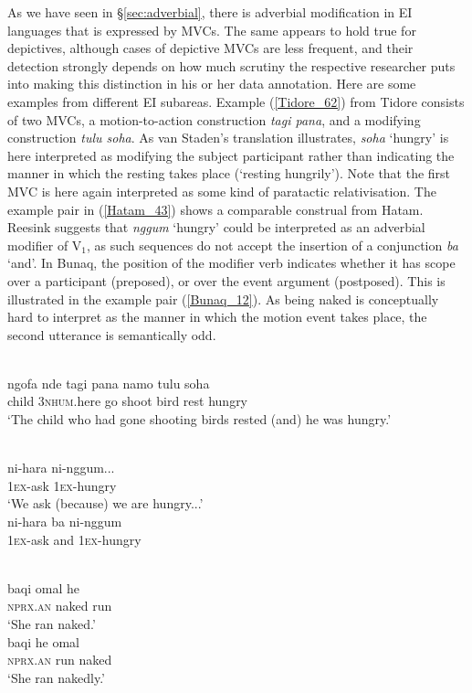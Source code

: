 As we have seen in §\ref{sec:adverbial}, there is adverbial modification in EI languages that is expressed by MVCs. The same appears to hold true for depictives, although cases of depictive MVCs are less frequent, and their detection strongly depends on how much scrutiny the respective researcher puts into making this distinction in his or her data annotation. Here are some examples from different EI subareas. Example (\ref{Tidore_62}) from Tidore consists of two MVCs, a motion-to-action construction \textit{tagi pana}, and a modifying construction \textit{tulu soha}. As van Staden's translation illustrates, \textit{soha} `hungry' is here interpreted as modifying the subject participant rather than indicating the manner in which the resting takes place (`resting hungrily'). Note that the first MVC is here again interpreted as some kind of paratactic relativisation. The example pair in (\ref{Hatam_43}) shows a comparable construal from Hatam. Reesink suggests that \textit{nggum} `hungry' could be interpreted as an adverbial modifier of V$_1$, as such sequences do not accept the insertion of a conjunction \textit{ba} `and'. In Bunaq, the position of the modifier verb indicates whether it has scope over a participant (preposed), or over the event argument (postposed). This is illustrated in the example pair (\ref{Bunaq_12}). As being naked is conceptually hard to interpret as the manner in which the motion event takes place, the second utterance is semantically odd.

\ea \label{Tidore_62}
\\
\gll ngofa nde tagi pana namo tulu soha \\
child 3\textsc{nhum}.here go shoot bird rest hungry \\
\glft `The child who had gone shooting birds rested (and) he was hungry.'\\ 
\z

\ea \label{Hatam_43}
\\
\ea
\gll ni-hara ni-nggum... \\
1\textsc{ex}-ask 1\textsc{ex}-hungry \\
\glft `We ask (because) we are hungry...' \\ 
\ex
\gll *ni-hara ba ni-nggum \\ 
1\textsc{ex}-ask and 1\textsc{ex}-hungry \\
\z
\z

\ea \label{Bunaq_12}
\\
\ea
\gll baqi omal he \\
\textsc{nprx}.\textsc{an} naked run \\
\glft `She ran naked.' \\ 
\ex
\gll baqi he omal \\ 
\textsc{nprx}.\textsc{an} run naked \\
\glft `She ran nakedly.' \\ 
\z
\z

